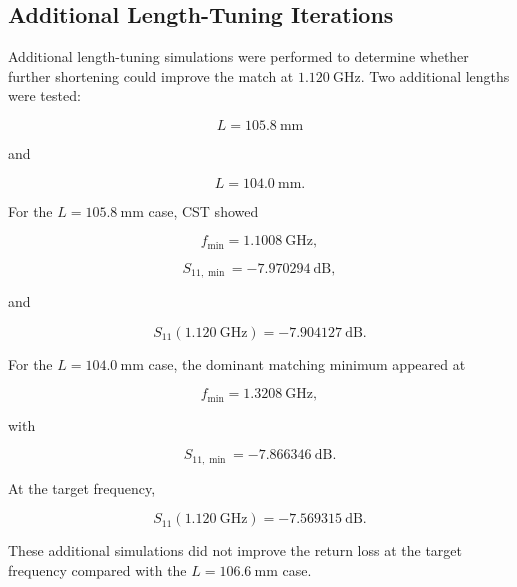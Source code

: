 \subsection{Additional Length-Tuning Iterations}

Additional length-tuning simulations were performed to determine whether further shortening could improve the match at \(1.120~\mathrm{GHz}\). Two additional lengths were tested:

\[
L = 105.8~\mathrm{mm}
\]

and

\[
L = 104.0~\mathrm{mm}.
\]

For the \(L=105.8~\mathrm{mm}\) case, CST showed

\[
f_{\min} = 1.1008~\mathrm{GHz},
\]

\[
S_{11,\min} = -7.970294~\mathrm{dB},
\]

and

\[
S_{11}(1.120~\mathrm{GHz}) = -7.904127~\mathrm{dB}.
\]

For the \(L=104.0~\mathrm{mm}\) case, the dominant matching minimum appeared at

\[
f_{\min} = 1.3208~\mathrm{GHz},
\]

with

\[
S_{11,\min} = -7.866346~\mathrm{dB}.
\]

At the target frequency,

\[
S_{11}(1.120~\mathrm{GHz}) = -7.569315~\mathrm{dB}.
\]

These additional simulations did not improve the return loss at the target frequency compared with the \(L=106.6~\mathrm{mm}\) case.

\begin{table}[htbp]
\centering
\caption{Length-tuning iterations for the \(5~\mathrm{mm}\) body-separation case.}
\label{tab:length-tuning-iterations}
\end{table}

